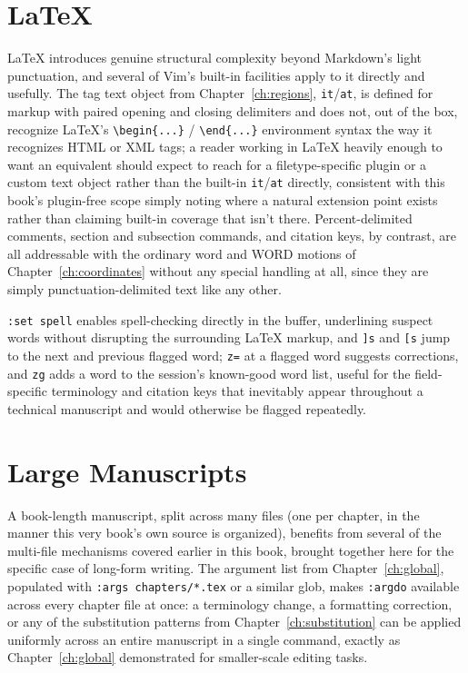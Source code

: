 \section{LaTeX}

LaTeX introduces genuine structural complexity beyond Markdown's light punctuation, and several of Vim's built-in facilities apply to it directly and usefully. The tag text object from Chapter~\ref{ch:regions}, \texttt{it}/\texttt{at}, is defined for markup with paired opening and closing delimiters and does not, out of the box, recognize LaTeX's \texttt{\textbackslash begin\{...\}} / \texttt{\textbackslash end\{...\}} environment syntax the way it recognizes HTML or XML tags; a reader working in LaTeX heavily enough to want an equivalent should expect to reach for a filetype-specific plugin or a custom text object rather than the built-in \texttt{it}/\texttt{at} directly, consistent with this book's plugin-free scope simply noting where a natural extension point exists rather than claiming built-in coverage that isn't there. Percent-delimited comments, section and subsection commands, and citation keys, by contrast, are all addressable with the ordinary word and WORD motions of Chapter~\ref{ch:coordinates} without any special handling at all, since they are simply punctuation-delimited text like any other.

\texttt{:set spell} enables spell-checking directly in the buffer, underlining suspect words without disrupting the surrounding LaTeX markup, and \texttt{]s} and \texttt{[s} jump to the next and previous flagged word; \texttt{z=} at a flagged word suggests corrections, and \texttt{zg} adds a word to the session's known-good word list, useful for the field-specific terminology and citation keys that inevitably appear throughout a technical manuscript and would otherwise be flagged repeatedly.

\section{Large Manuscripts}

A book-length manuscript, split across many files (one per chapter, in the manner this very book's own source is organized), benefits from several of the multi-file mechanisms covered earlier in this book, brought together here for the specific case of long-form writing. The argument list from Chapter~\ref{ch:global}, populated with \texttt{:args chapters/*.tex} or a similar glob, makes \texttt{:argdo} available across every chapter file at once: a terminology change, a formatting correction, or any of the substitution patterns from Chapter~\ref{ch:substitution} can be applied uniformly across an entire manuscript in a single command, exactly as Chapter~\ref{ch:global} demonstrated for smaller-scale editing tasks.

